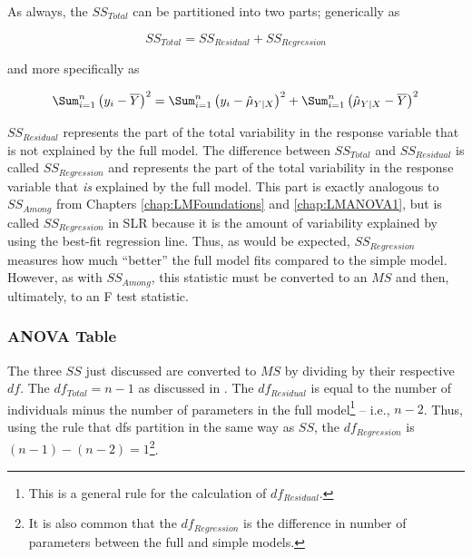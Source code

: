 \documentclass[10pt,openany]{book}\usepackage[]{graphicx}\usepackage[]{color}
\begin{document}

As always, the $SS_{Total}$ can be partitioned into two parts; generically as

\[ SS_{Total} = SS_{Residual} + SS_{Regression} \]

and more specifically as

\[ \Sum_{i=1}^{n}\left(y_{i}-\overline{Y}\right)^{2} = \Sum_{i=1}^{n}\left(y_{i}-\hat{\mu}_{Y|X}\right)^{2} + \Sum_{i=1}^{n}\left(\hat{\mu}_{Y|X}-\overline{Y}\right)^{2} \]

$SS_{Residual}$ represents the part of the total variability in the response variable that is not explained by the full model.  The difference between $SS_{Total}$ and  $SS_{Residual}$ is called  $SS_{Regression}$ and represents the part of the total variability in the response variable that \emph{is} explained by the full model.  This part is exactly analogous to $SS_{Among}$ from Chapters \ref{chap:LMFoundations} and \ref{chap:LMANOVA1}, but is called $SS_{Regression}$ in SLR because it is the amount of variability explained by using the best-fit regression line.  Thus, as would be expected, $SS_{Regression}$ measures how much ``better'' the full model fits compared to the simple model.  However, as with $SS_{Among}$, this statistic must be converted to an $MS$ and then, ultimately, to an F test statistic.


\vspace{-12pt}

\vspace{-12pt}


\subsubsection{ANOVA Table}
The three $SS$ just discussed are converted to $MS$ by dividing by their respective $df$.  The $df_{Total}=n-1$ as discussed in .  The $df_{Residual}$ is equal to the number of individuals minus the number of parameters in the full model\footnote{This is a general rule for the calculation of $df_{Residual}$.} -- i.e., $n-2$.  Thus, using the rule that dfs partition in the same way as $SS$, the $df_{Regression}$ is $(n-1)-$$(n-2)$$=1$\footnote{It is also common that the $df_{Regression}$ is the difference in number of parameters between the full and simple models.}.
\end{document}
